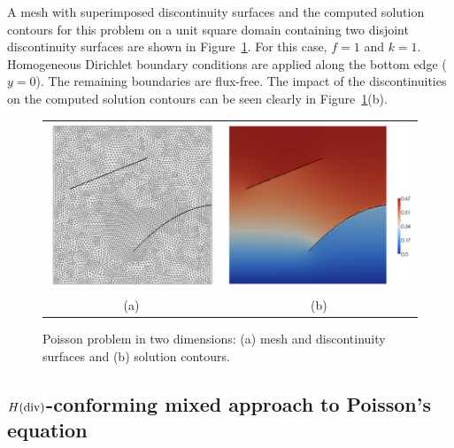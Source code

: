 A mesh with superimposed discontinuity surfaces and the computed
solution contours for this problem on a unit square domain
containing two disjoint discontinuity surfaces are shown in
Figure~\ref{fig:nikbakht:poisson_contours}.  For this case, $f = 1$
and $k = 1$.  Homogeneous Dirichlet boundary conditions are applied
along the bottom edge ($y = 0$). The remaining boundaries are flux-free.
The impact of the discontinuities on the computed solution contours can
be seen clearly in Figure~\ref{fig:nikbakht:poisson_contours}(b).
%
\begin{figure}
\begin{tabular}{cc}
  \includegraphics[height=0.45\textwidth]{chapters/nikbakht/png/mesh.png}
&
   \includegraphics[height=0.45\textwidth]{chapters/nikbakht/png/result.png}
\\
(a) & (b)
\end{tabular}
\caption{Poisson problem in two dimensions: (a) mesh and discontinuity
surfaces and (b) solution contours.}
\label{fig:nikbakht:poisson_contours}
\end{figure}
\subsection{$H(\rm div)$-conforming mixed approach to Poisson's equation}

